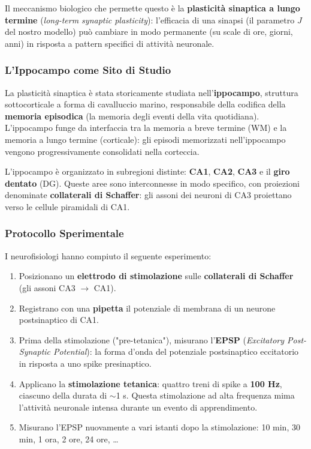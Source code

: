 Il meccanismo biologico che permette questo è la \textbf{plasticità sinaptica a lungo termine} (\textit{long-term synaptic plasticity}): l'efficacia di una sinapsi (il parametro $J$ del nostro modello) può cambiare in modo permanente (su scale di ore, giorni, anni) in risposta a pattern specifici di attività neuronale.

\subsubsection{L'Ippocampo come Sito di Studio}

La plasticità sinaptica è stata storicamente studiata nell'\textbf{ippocampo}, struttura sottocorticale a forma di cavalluccio marino, responsabile della codifica della \textbf{memoria episodica} (la memoria degli eventi della vita quotidiana). L'ippocampo funge da interfaccia tra la memoria a breve termine (WM) e la memoria a lungo termine (corticale): gli episodi memorizzati nell'ippocampo vengono progressivamente consolidati nella corteccia.

L'ippocampo è organizzato in subregioni distinte: \textbf{CA1}, \textbf{CA2}, \textbf{CA3} e il \textbf{giro dentato} (DG). Queste aree sono interconnesse in modo specifico, con proiezioni denominate \textbf{collaterali di Schaffer}: gli assoni dei neuroni di CA3 proiettano verso le cellule piramidali di CA1.


\subsubsection{Protocollo Sperimentale}

I neurofisiologi hanno compiuto il seguente esperimento:
\begin{enumerate}
    \item Posizionano un \textbf{elettrodo di stimolazione} sulle \textbf{collaterali di Schaffer} (gli assoni CA3 $\rightarrow$ CA1).
    \item Registrano con una \textbf{pipetta} il potenziale di membrana di un neurone postsinaptico di CA1.
    \item Prima della stimolazione ("pre-tetanica"), misurano l'\textbf{EPSP} (\textit{Excitatory Post-Synaptic Potential}): la forma d'onda del potenziale postsinaptico eccitatorio in risposta a uno spike presinaptico.
    \item Applicano la \textbf{stimolazione tetanica}: quattro treni di spike a \textbf{100 Hz}, ciascuno della durata di $\sim$1 s. Questa stimolazione ad alta frequenza mima l'attività neuronale intensa durante un evento di apprendimento.
    \item Misurano l'EPSP nuovamente a vari istanti dopo la stimolazione: 10 min, 30 min, 1 ora, 2 ore, 24 ore, \dots
\end{enumerate}

